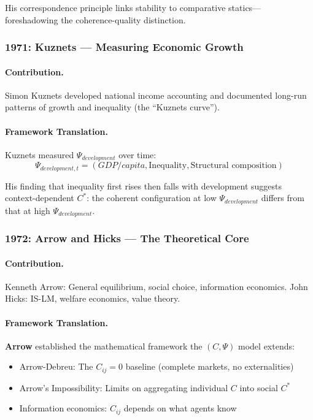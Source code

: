 \documentclass[12pt,a4paper]{article}
\begin{document}
His correspondence principle links stability to comparative statics---
foreshadowing the coherence-quality distinction.

\subsubsection{1971: Kuznets --- Measuring Economic Growth}

\paragraph{Contribution.}
Simon Kuznets developed national income accounting and documented
long-run patterns of growth and inequality (the ``Kuznets curve'').

\paragraph{Framework Translation.}
Kuznets measured $\Psi_{development}$ over time:
\begin{equation}
  \Psi_{development,t} = (GDP/capita, \text{Inequality}, \text{Structural composition})
\end{equation}

His finding that inequality first rises then falls with development
suggests context-dependent $C^*$: the coherent configuration
at low $\Psi_{development}$ differs from that at high $\Psi_{development}$.

\subsubsection{1972: Arrow and Hicks --- The Theoretical Core}

\paragraph{Contribution.}
Kenneth Arrow: General equilibrium, social choice, information economics.
John Hicks: IS-LM, welfare economics, value theory.

\paragraph{Framework Translation.}
\textbf{Arrow} established the mathematical framework the $(C, \Psi)$ model extends:
\begin{itemize}
  \item Arrow-Debreu: The $C_{ij} = 0$ baseline (complete markets, no externalities)
  \item Arrow's Impossibility: Limits on aggregating individual $C$ into social $C^*$
  \item Information economics: $C_{ij}$ depends on what agents know
\end{itemize}
\end{document}
